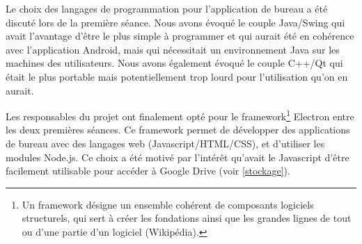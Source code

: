 \par
Le choix des langages de programmation pour l'application de bureau a été discuté lors de la première séance. Nous avons évoqué le couple Java/Swing qui avait l'avantage d'être le plus simple à programmer et qui aurait été en cohérence avec l'application Android, mais qui nécessitait un environnement Java sur les machines des utilisateurs. Nous avons également évoqué le couple C++/Qt qui était le plus portable mais potentiellement trop lourd pour l'utilisation qu'on en aurait. 
\par
Les responsables du projet ont finalement opté pour le framework\footnote{Un framework désigne un ensemble cohérent de composants logiciels structurels, qui sert à créer les fondations ainsi que les grandes lignes de tout ou d’une partie d'un logiciel (Wikipédia).} Electron entre les deux premières séances. Ce framework permet de développer des applications de bureau avec des langages web (Javascript/HTML/CSS), et d'utiliser les modules Node.js. Ce choix a été motivé par l'intérêt qu'avait le Javascript d'être facilement utilisable pour accéder à Google Drive (voir \ref{stockage}).\\

\par
